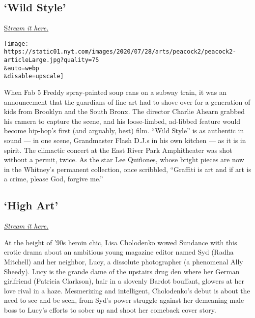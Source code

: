 \hypertarget{wild-style}{%
\subsection{`Wild Style'}\label{wild-style}}

\href{https://www.peacocktv.com/watch/asset/movies/music/wild-style/79ccabbc-5c57-3f8d-9047-553b9e3843c4}{S}\href{https://www.peacocktv.com/watch/asset/movies/music/wild-style/79ccabbc-5c57-3f8d-9047-553b9e3843c4}{\emph{tream
it here.}}

\texttt{[image: https://static01.nyt.com/images/2020/07/28/arts/peacock2/peacock2-articleLarge.jpg?quality=75\\\&auto=webp\\\&disable=upscale]}

When Fab 5 Freddy spray-painted soup cans on a subway train, it was an
announcement that the guardians of fine art had to shove over for a
generation of kids from Brooklyn and the South Bronx. The director
Charlie Ahearn grabbed his camera to capture the scene, and his
loose-limbed, ad-libbed feature would become hip-hop's first (and
arguably, best) film. ``Wild Style'' is as authentic in sound --- in one
scene, Grandmaster Flash D.J.s in his own kitchen --- as it is in
spirit. The climactic concert at the East River Park Amphitheater was
shot without a permit, twice. As the star Lee Quiñones, whose bright
pieces are now in the Whitney's permanent collection, once scribbled,
``Graffiti is art and if art is a crime, please God, forgive me.''

\hypertarget{high-art}{%
\subsection{`High Art'}\label{high-art}}

\href{https://www.peacocktv.com/watch/asset/movies/drama/high-art/73784198-dcd8-3d5c-bee8-8dd75ab75a7a}{\emph{Stream
it here.}}

At the height of '90s heroin chic, Lisa Cholodenko wowed Sundance with
this erotic drama about an ambitious young magazine editor named Syd
(Radha Mitchell) and her neighbor, Lucy, a dissolute photographer (a
phenomenal Ally Sheedy). Lucy is the grande dame of the upstairs drug
den where her German girlfriend (Patricia Clarkson), hair in a slovenly
Bardot bouffant, glowers at her love rival in a haze. Mesmerizing and
intelligent, Cholodenko's debut is about the need to see and be seen,
from Syd's power struggle against her demeaning male boss to Lucy's
efforts to sober up and shoot her comeback cover story.

